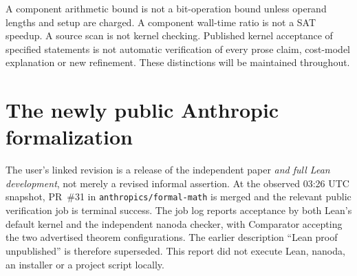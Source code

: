 \documentclass[11pt,letterpaper]{article}
\theoremstyle{remark}\newtheorem{remark}[theorem]{Remark}
\begin{document}
A component arithmetic bound is not a bit-operation bound unless operand lengths and setup are charged. A component wall-time ratio is not a SAT speedup. A source scan is not kernel checking. Published kernel acceptance of specified statements is not automatic verification of every prose claim, cost-model explanation or new refinement. These distinctions will be maintained throughout.

\section{The newly public Anthropic formalization}
\label{sec:anthropic}
The user's linked revision is a release of the independent paper \emph{and full Lean development}, not merely a revised informal assertion. At the observed 03:26 UTC snapshot, PR~\#31 in \texttt{anthropics/formal-math} is merged and the relevant public verification job is terminal success. The job log reports acceptance by both Lean's default kernel and the independent nanoda checker, with Comparator accepting the two advertised theorem configurations. The earlier description ``Lean proof unpublished'' is therefore superseded. This report did not execute Lean, nanoda, an installer or a project script locally. \cite{anthropicpr,anthropicci}
\end{document}
